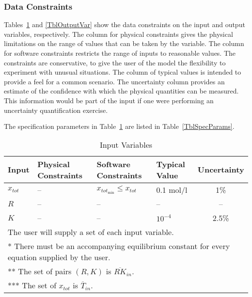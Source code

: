 \documentclass[12pt]{article}
\begin{document}

\subsubsection{Data Constraints} \label{sec_DataConstraints}    

Tables~\ref{TblInputVar} and \ref{TblOutputVar} show the data constraints on the
input and output variables, respectively.  The column for physical constraints 
gives the physical limitations on the range of values that can be taken by the
variable.  The column for software constraints restricts the range of inputs to
reasonable values.  The constraints are conservative, to give the user of the
model the flexibility to experiment with unusual situations.  The column of
typical values is intended to provide a feel for a common scenario.  The
uncertainty column provides an estimate of the confidence with which the
physical quantities can be measured.  This information would be part of the
input if one were performing an uncertainty quantification exercise.

The specification parameters in Table~\ref{TblInputVar} are listed in
Table~\ref{TblSpecParams}.


\begin{table}[!h]
  \centering
  \caption{Input Variables} \label{TblInputVar}
  \renewcommand{\arraystretch}{1.2}
\noindent \begin{tabular}{l l l l c} 
  \toprule
  \textbf{Input} & \textbf{Physical Constraints} & \textbf{Software Constraints}  
                   & \textbf{Typical Value} & \textbf{Uncertainty}\\
  \midrule 
  $x_{tot}$ & -- & $x_{{tot}_{\text{min}}} \leq x_{tot} $ & 0.1 
    \si[per-mode=symbol] {\mole\per\litre} & 1\%\\
  $R$ & -- & -- & -- & --\\
  $K$ & -- & -- & $10^{-4}$ & 2.5\%\\
  \bottomrule
  \multicolumn{5}{l}{\scriptsize * The user will supply a set of each input 
    variable.}\\
  \multicolumn{5}{l}{\scriptsize ** There must be an accompanying equilibrium 
    constant for every equation supplied by the user.}\\
  \multicolumn{5}{l}{\scriptsize *** The set of pairs $(R, K)$ is 
    $\overline {RK}_{in}$.}\\
  \multicolumn{5}{l}{\scriptsize **** The set of $x_{tot}$ is 
    $\overline {T}_{in}$.}
\end{tabular}
\end{table}
\end{document}
